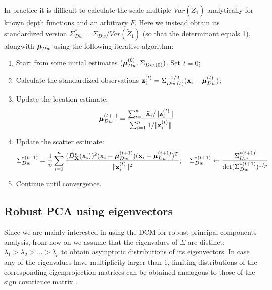 \documentclass[fleqn,11pt]{article}
\begin{document}
In practice it is difficult to calculate the scale multiple $Var (\tilde Z_1)$ analytically for known depth functions and an arbitrary $F$. Here we instead obtain its standardized version $\Sigma_{Dw}^* = \Sigma_{Dw} / Var(\tilde Z_1)$ (so that the determinant equals 1), alongwith ${\boldsymbol{\mu}}_{Dw}$ using the following iterative algorithm:

\begin{enumerate}
\item Start from some initial estimates $({\boldsymbol{\mu}}_{Dw}^{(0)}, \Sigma_{Dw,(0)})$. Set $t=0$;

\item Calculate the standardized observations ${\bf{z}}_i^{(t)} = \Sigma_{Dw,(t)}^{-1/2} ({\bf{x}}_i - {\boldsymbol{\mu}}_{Dw}^{(t)})$;

\item Update the location estimate:
%
$$
{\boldsymbol{\mu}}_{Dw}^{(t+1)} = \frac{\sum_{i=1}^n \tilde {{\bf{x}}}_i / \| {\bf{z}}_i^{(t)} \| }{\sum_{i=1}^n 1 / \| {\bf{z}}_i^{(t)} \|}
$$
%
\item Update the scatter estimate:
%
$$
\Sigma_{Dw}^{*(t+1)} = \frac{1}{n} \sum_{i=1}^n \frac{(\tilde D^n_{\mathbf{X}} ({\bf{x}}_i))^2 ({\bf{x}}_i - {\boldsymbol{\mu}}_{Dw}^{(t+1)})({\bf{x}}_i - {\boldsymbol{\mu}}_{Dw}^{(t+1)})^T}{\| {\bf{z}}_i^{(t)} \|^2}; \quad \Sigma_{Dw}^{*(t+1)} \leftarrow \frac{\Sigma_{Dw}^{*(t+1)}}{\text{det} (\Sigma_{Dw}^{*(t+1)})^{1/p}}
$$
%
\item Continue until convergence.
\end{enumerate}

\subsection{Robust PCA using eigenvectors}

Since we are mainly interested in using the DCM for robust principal components analysis, from now on we assume that the eigenvalues of $\Sigma$ are distinct: $\lambda_1 > \lambda_2 > ... > \lambda_p$ to obtain asymptotic distributions of its eigenvectors. In case any of the eigenvalues have multiplicity larger than 1, limiting distributions of the corresponding eigenprojection matrices can be obtained analogous to those of the sign covariance matrix \citep{magyar14}.
\end{document}
